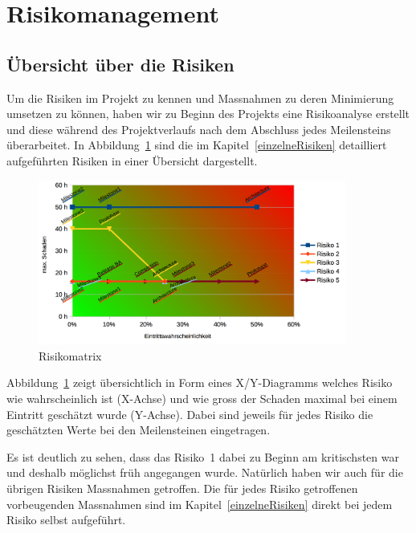 \chapter*{Risikomanagement}
	
	\label{risiken}
	
	\section*{Übersicht über die Risiken}
		Um die Risiken im Projekt zu kennen und Massnahmen zu deren Minimierung umsetzen zu können, haben wir zu Beginn des Projekts eine Risikoanalyse erstellt und diese während des Projektverlaufs nach dem Abschluss jedes Meilensteins überarbeitet.
		In Abbildung~\ref{fig:RiskMatrix} sind die im Kapitel~\ref{einzelneRisiken} detailliert aufgeführten Risiken in einer Übersicht dargestellt.
		
		\begin{figure}[H]
			\includegraphics[width=0.9\textwidth]{projectPlan/media/img/risikomatrix.png}
			\centering
			\caption{Risikomatrix}
			\label{fig:RiskMatrix}
		\end{figure}
	
		Abbildung~\ref{fig:RiskMatrix} zeigt übersichtlich in Form eines X/Y-Diagramms welches Risiko wie wahrscheinlich ist (X-Achse) und wie gross der Schaden maximal bei einem Eintritt geschätzt wurde (Y-Achse).
		Dabei sind jeweils für jedes Risiko die geschätzten Werte bei den Meilensteinen eingetragen.
		
		Es ist deutlich zu sehen, dass das Risiko~1 dabei zu Beginn am kritischsten war und deshalb möglichst früh angegangen wurde.
		Natürlich haben wir auch für die übrigen Risiken Massnahmen getroffen.
		Die für jedes Risiko getroffenen vorbeugenden Massnahmen sind im Kapitel~\ref{einzelneRisiken} direkt bei jedem Risiko selbst aufgeführt.
	

